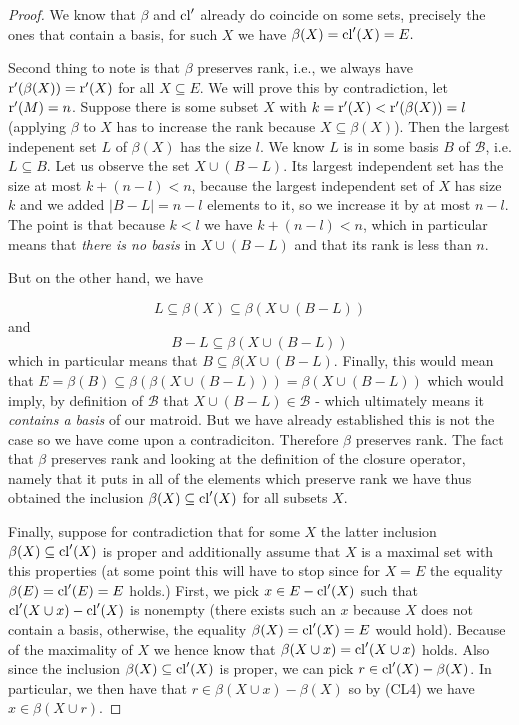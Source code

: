 \begin{proof}
We know that $\beta$ and $\mathrm{cl}'$ already do coincide on some sets, precisely the ones that contain a basis, for such $X$ we have $\beta(X) = \mathrm{cl}'(X) = E.$

Second thing to note is that $\beta$ preserves rank, i.e., we always have $\operatorname{r}'(\beta(X)) = \operatorname{r}'(X)$ for all $X\subseteq E$. We will prove this by contradiction, let $\operatorname{r}'(M) = n$. Suppose there is some subset $X$ with $k  = \operatorname{r}'(X)<\operatorname{r}'(\beta(X)) = l$ (applying $\beta$ to $X$ has to increase the rank because $X \subseteq \beta(X)$). Then the largest indepenent set $L$ of $\beta(X)$ has the size $l$. We know $L$ is in some basis $B$ of $\mathcal{B}$, i.e. $L \subseteq B$. Let us observe the set $X \cup (B-L)$.  Its largest independent set has the size at most $k + (n-l)<n$, because the largest independent set of $X$ has size $k$ and we added $|B-L| = n - l$ elements to it, so we increase it by at most $n-l$. The point is that because $k<l$ we have $k + (n-l)<n$, which in particular means that \textit{there is no basis} in $X \cup (B-L)$ and that its rank is less than $n.$


But on the other hand, we have

$$L \subseteq \beta(X) \subseteq \beta(X \cup (B-L))$$ and $$B-L \subseteq \beta(X \cup (B-L))$$ which in particular means that $B \subseteq \beta(X \cup (B-L)$. Finally, this would mean that  
$E = \beta(B)\subseteq \beta(\beta(X \cup (B-L))) = \beta(X \cup (B-L))$ which would imply, by definition of $\mathcal{B}$ that $X \cup (B-L)
\in \mathcal{B}$ - which ultimately means it \textit{contains a basis} of our matroid. But we have already established this is not the case so we have come upon a contradiciton. Therefore $\beta$ preserves rank.
The fact that $\beta$ preserves rank and looking at the definition of the closure operator, namely that it puts in all of the elements which preserve rank we have thus obtained the inclusion $\beta(X) \subseteq \mathrm{cl}'(X)$ for all subsets $X.$

Finally, suppose for contradiction that for some $X$ the latter inclusion $\beta(X) \subseteq \mathrm{cl}'(X)$ is proper and additionally assume that $X$ is a maximal set with this properties (at some point this will have to stop since for $X =E$ the equality $\beta(E) = \mathrm{cl}'(E) = E$ holds.) First, we pick $x \in E - \mathrm{cl}'(X)$ such that $\mathrm{cl}'(X\cup x) - \mathrm{cl}'(X)$ is nonempty (there exists such an $x$ because $X$ does not contain a basis, otherwise, the equality $\beta(X) = \mathrm{cl}'(X) = E$ would hold).
Because of the maximality of $X$ we hence know that $\beta(X\cup x) = \mathrm{cl}'(X \cup x)$ holds. Also since the inclusion $\beta(X) \subseteq \mathrm{cl}'(X)$ is proper, we can pick $r \in \mathrm{cl}'(X) - \beta(X)$. In particular, we then have that $r \in \beta(X\cup x) - \beta(X)$ so by (CL4) we have $x \in \beta(X\cup r)$.


\end{proof}
